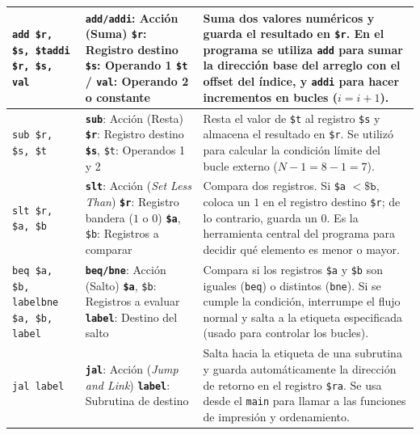 \documentclass[12pt,a4paper]{article}
\begin{document}
\begin{longtable}{@{} L{2.8cm} L{4.5cm} L{8.3cm}}
\midrule
\texttt{add \$r, \$s, \$t}\newline \texttt{addi \$r, \$s, val} & 
\textbf{\texttt{add/addi}}: Acción (Suma)\newline
\textbf{\texttt{\$r}}: Registro destino\newline
\textbf{\texttt{\$s}}: Operando 1\newline
\textbf{\texttt{\$t} / \texttt{val}}: Operando 2 o constante & 
Suma dos valores numéricos y guarda el resultado en \texttt{\$r}. En el programa se utiliza \texttt{add} para sumar la dirección base del arreglo con el offset del índice, y \texttt{addi} para hacer incrementos en bucles ($i = i + 1$). \\
\midrule
\texttt{sub \$r, \$s, \$t} & 
\textbf{\texttt{sub}}: Acción (Resta)\newline
\textbf{\texttt{\$r}}: Registro destino\newline
\textbf{\texttt{\$s}}, \texttt{\$t}: Operandos 1 y 2 & 
Resta el valor de \texttt{\$t} al registro \texttt{\$s} y almacena el resultado en \texttt{\$r}. Se utilizó para calcular la condición límite del bucle externo ($N - 1 = 8 - 1 = 7$). \\
\midrule
\texttt{slt \$r, \$a, \$b} & 
\textbf{\texttt{slt}}: Acción (\textit{Set Less Than})\newline
\textbf{\texttt{\$r}}: Registro bandera ($1$ o $0$)\newline
\textbf{\texttt{\$a}}, \texttt{\$b}: Registros a comparar & 
Compara dos registros. Si \texttt{\$a} $< \mathtt{\$b}$, coloca un $1$ en el registro destino \texttt{\$r}; de lo contrario, guarda un $0$. Es la herramienta central del programa para decidir qué elemento es menor o mayor. \\
\midrule
\texttt{beq \$a, \$b, label}\newline \texttt{bne \$a, \$b, label} & 
\textbf{\texttt{beq/bne}}: Acción (Salto)\newline
\textbf{\texttt{\$a}}, \texttt{\$b}: Registros a evaluar\newline
\textbf{\texttt{label}}: Destino del salto & 
Compara si los registros \texttt{\$a} y \texttt{\$b} son iguales (\texttt{beq}) o distintos (\texttt{bne}). Si se cumple la condición, interrumpe el flujo normal y salta a la etiqueta especificada (usado para controlar los bucles). \\
\midrule
\texttt{jal label} & 
\textbf{\texttt{jal}}: Acción (\textit{Jump and Link})\newline
\textbf{\texttt{label}}: Subrutina de destino & 
Salta hacia la etiqueta de una subrutina y guarda automáticamente la dirección de retorno en el registro \texttt{\$ra}. Se usa desde el \texttt{main} para llamar a las funciones de impresión y ordenamiento. \\

\end{longtable}
\end{document}
